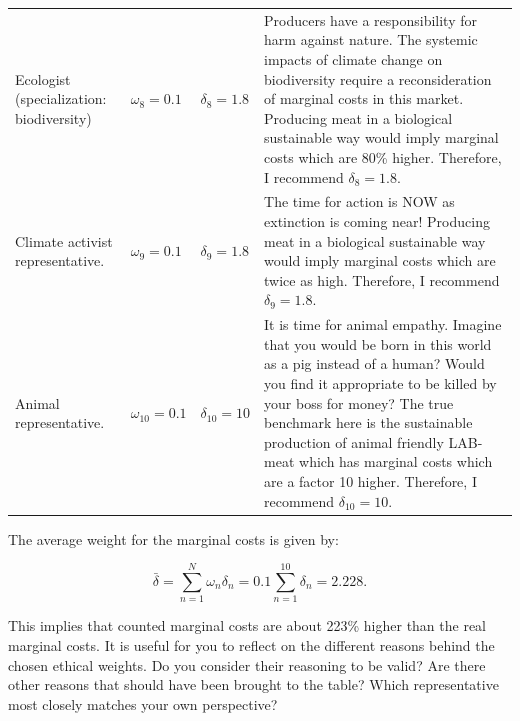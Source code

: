 \documentclass[
]{book}
\begin{document}
\begin{table}
\begin{tabular}[t]{llll}
Ecologist (specialization: biodiversity) & $\omega_8 = 0.1$ & $\delta_8 = 1.8$ & Producers have a responsibility for harm against nature. The systemic impacts of climate change on biodiversity require a reconsideration of marginal costs in this market. Producing meat in a biological sustainable way would imply marginal costs which are 80\% higher. Therefore, I recommend 
$\delta_8=1.8$.\\
Climate activist representative. & $\omega_9 = 0.1$ & $\delta_9 = 1.8$ & The time for action is NOW as extinction is coming near! Producing meat in a biological sustainable way would imply marginal costs which are twice as high. Therefore, I recommend $\delta_9=1.8$.\\
Animal representative. & $\omega_{10} = 0.1$ & $\delta_{10} = 10$ & It is time for animal empathy. Imagine that you would be born in this world as a pig instead of a human? Would you find it appropriate to be killed by your boss for money? The true benchmark here is the sustainable production of animal friendly LAB-meat which has marginal costs which are a factor 10 higher. Therefore, I recommend $\delta_10=10$.\\
\bottomrule
\end{tabular}
\end{table}

The average weight for the marginal costs is given by:

\begin{equation}
 \bar{\delta} = \sum_{n=1}^N \omega_n \delta_n = 0.1 \sum_{n=1}^{10} \delta_n = 2.228.
\end{equation}

This implies that counted marginal costs are about 223\% higher than the real marginal costs. It is useful for you to reflect on the different reasons behind the chosen ethical weights. Do you consider their reasoning to be valid? Are there other reasons that should have been brought to the table? Which representative most closely matches your own perspective?
\end{document}
